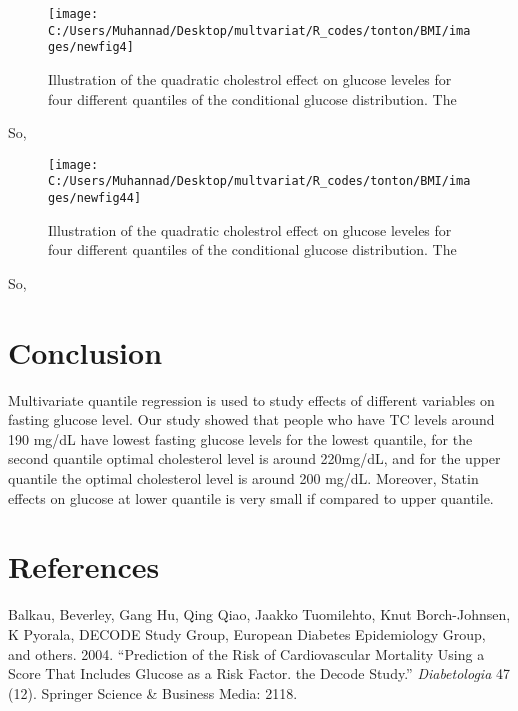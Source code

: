 \documentclass[12pt,]{article}
\begin{document}
\begin{figure}

{\centering \texttt{[image: C:/Users/Muhannad/Desktop/multvariat/R\_codes/tonton/BMI/images/newfig4]} 

}

\caption{Illustration of the quadratic cholestrol effect on glucose leveles for four different quantiles of the conditional glucose distribution.  The }\label{fig:resu4}
\end{figure}

So,

\begin{figure}

{\centering \texttt{[image: C:/Users/Muhannad/Desktop/multvariat/R\_codes/tonton/BMI/images/newfig44]} 

}

\caption{Illustration of the quadratic cholestrol effect on glucose leveles for four different quantiles of the conditional glucose distribution.  The }\label{fig:resu44}
\end{figure}

So,

\section{Conclusion}

Multivariate quantile regression is used to study effects of different
variables on fasting glucose level. Our study showed that people who
have TC levels around 190 mg/dL have lowest fasting glucose levels for
the lowest quantile, for the second quantile optimal cholesterol level
is around 220mg/dL, and for the upper quantile the optimal cholesterol
level is around 200 mg/dL. Moreover, Statin effects on glucose at lower
quantile is very small if compared to upper quantile. \newpage
\section{References}

\hypertarget{refs}{}
\hypertarget{ref-balkau2004prediction}{}
Balkau, Beverley, Gang Hu, Qing Qiao, Jaakko Tuomilehto, Knut
Borch-Johnsen, K Pyorala, DECODE Study Group, European Diabetes
Epidemiology Group, and others. 2004. ``Prediction of the Risk of
Cardiovascular Mortality Using a Score That Includes Glucose as a Risk
Factor. the Decode Study.'' \emph{Diabetologia} 47 (12). Springer
Science \& Business Media: 2118.
\end{document}
